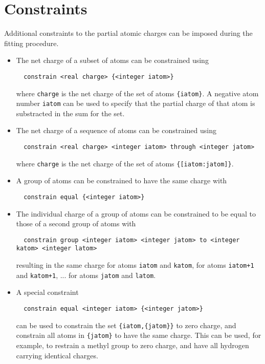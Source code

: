 \section{Constraints}
Additional constraints to the partial atomic charges can be imposed during
the fitting procedure.
\begin{itemize}
\item
The net charge of a subset of atoms can be constrained using
\begin{verbatim}
  constrain <real charge> {<integer iatom>}
\end{verbatim}
where \verb+charge+ is the net charge of the set of atoms \verb+{iatom}+.
A negative atom number \verb+iatom+ can be used to specify that the
partial charge of that atom is substracted in the sum for the set.
\item
The net charge of a sequence of atoms can be constrained using
\begin{verbatim}
  constrain <real charge> <integer iatom> through <integer jatom>
\end{verbatim}
where \verb+charge+ is the net charge of the set of atoms \verb+{[iatom:jatom]}+.
\item
A group of atoms can be constrained to have the same charge with
\begin{verbatim}
  constrain equal {<integer iatom>}
\end{verbatim}
\item
The individual charge of a group of atoms can be constrained to be equal to
those of a second group of atoms with
\begin{verbatim}
  constrain group <integer iatom> <integer jatom> to <integer katom> <integer latom>
\end{verbatim}
resulting in the same charge for atoms \verb+iatom+ and \verb+katom+, for
atoms \verb.iatom+1. and \verb.katom+1., ... for atoms \verb+jatom+ and \verb+latom+.
\item
A special constraint
\begin{verbatim}
  constrain equal <integer iatom> {<integer jatom>}
\end{verbatim}
can be used to constrain the set \verb+{iatom,{jatom}}+ to zero charge, and
constrain all atoms in \verb+{jatom}+ to have the same charge. This can be used,
for example, to restrain a methyl group to zero charge, and have all hydrogen
carrying identical charges.
\end{itemize}

